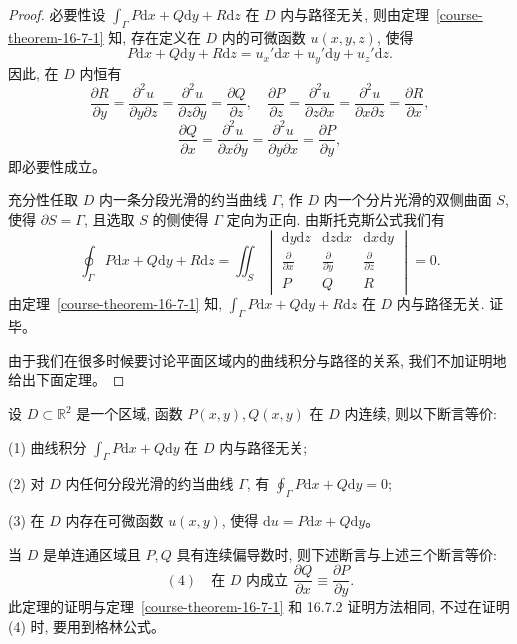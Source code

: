 \documentclass[UTF8,12pt,a4paper,fontset=fandol]{ctexart}
\begin{document}
\begin{proof}\quad 必要性\quad 设 $\int_\Gamma P\mathrm dx+Q\mathrm dy+R\mathrm dz$ 在 $D$ 内与路径无关, 则由定理~\ref{course-theorem-16-7-1}  知, 存在定义在 $D$ 内的可微函数 $u(x,y,z)$, 使得
\[
  P\mathrm dx+Q\mathrm dy+R\mathrm dz=u_x'\mathrm dx+u_y'\mathrm dy+u_z'\mathrm dz.
\]
因此, 在 $D$ 内恒有
\[
  \frac{\partial R}{\partial y}
  =\frac{\partial^2u}{\partial y\partial z}
  =\frac{\partial^2u}{\partial z\partial y}
  =\frac{\partial Q}{\partial z},
  \quad
  \frac{\partial P}{\partial z}
  =\frac{\partial^2u}{\partial z\partial x}
  =\frac{\partial^2u}{\partial x\partial z}
  =\frac{\partial R}{\partial x},
\]
\[
  \frac{\partial Q}{\partial x}
  =\frac{\partial^2u}{\partial x\partial y}
  =\frac{\partial^2u}{\partial y\partial x}
  =\frac{\partial P}{\partial y},
\]
即必要性成立。

充分性\quad 任取 $D$ 内一条分段光滑的约当曲线 $\Gamma$, 作 $D$ 内一个分片光滑的双侧曲面 $S$, 使得 $\partial S=\Gamma$, 且选取 $S$ 的侧使得 $\Gamma$ 定向为正向. 由斯托克斯公式我们有
\[
  \oint_\Gamma P\mathrm dx+Q\mathrm dy+R\mathrm dz
  =
  \iint_S
  \begin{vmatrix}
    \mathrm dy\mathrm dz&\mathrm dz\mathrm dx&\mathrm dx\mathrm dy\\
    \frac{\partial}{\partial x}&\frac{\partial}{\partial y}&\frac{\partial}{\partial z}\\
    P&Q&R
  \end{vmatrix}
  =0.
\]
由定理~\ref{course-theorem-16-7-1}  知, $\int_\Gamma P\mathrm dx+Q\mathrm dy+R\mathrm dz$ 在 $D$ 内与路径无关. 证毕。

由于我们在很多时候要讨论平面区域内的曲线积分与路径的关系, 我们不加证明地给出下面定理。

\end{proof}
\begin{theorem}\label{course-theorem-16-7-3}\quad 设 $D\subset\mathbb R^2$ 是一个区域, 函数 $P(x,y),Q(x,y)$ 在 $D$ 内连续, 则以下断言等价:

(1) 曲线积分 $\int_\Gamma P\mathrm dx+Q\mathrm dy$ 在 $D$ 内与路径无关;

(2) 对 $D$ 内任何分段光滑的约当曲线 $\Gamma$, 有 $\oint_\Gamma P\mathrm dx+Q\mathrm dy=0$;

(3) 在 $D$ 内存在可微函数 $u(x,y)$, 使得 $\mathrm du=P\mathrm dx+Q\mathrm dy$。

当 $D$ 是单连通区域且 $P,Q$ 具有连续偏导数时, 则下述断言与上述三个断言等价:
\[
  (4)\quad \text{在 }D\text{ 内成立 }\frac{\partial Q}{\partial x}\equiv\frac{\partial P}{\partial y}.
\]
此定理的证明与定理~\ref{course-theorem-16-7-1}  和 16.7.2 证明方法相同, 不过在证明 (4) 时, 要用到格林公式。

\end{theorem}
\end{document}
